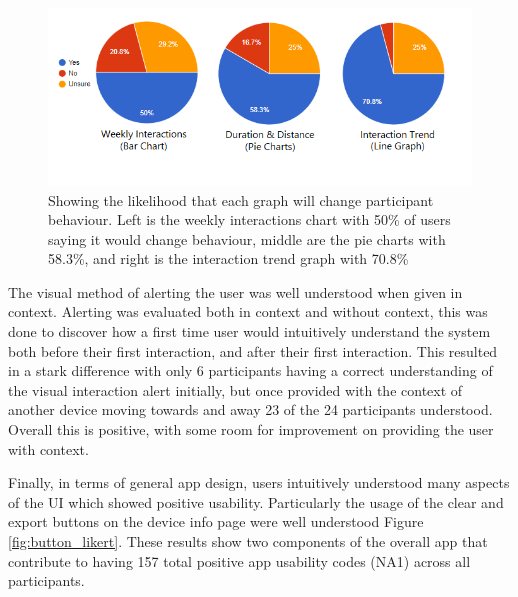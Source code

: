 \documentclass{l4proj}
\begin{document}
\begin{figure}[!htb]
    \centering
    \includegraphics[width=0.85\linewidth]{images/behaviour-graphs.png}

    \caption{ Showing the likelihood that each graph will change participant behaviour. Left is the weekly interactions chart with 50\% of users saying it would change behaviour, middle are the pie charts with 58.3\%, and right is the interaction trend graph with 70.8\% }

    \label{fig:behaviour}
\end{figure}

The visual method of alerting the user was well understood when given in context. Alerting was evaluated both in context and without context, this was done to discover how a first time user would intuitively understand the system both before their first interaction, and after their first interaction. This resulted in a stark difference with only 6 participants having a correct understanding of the visual interaction alert initially, but once provided with the context of another device moving towards and away 23 of the 24 participants understood. Overall this is positive, with some room for improvement on providing the user with context.

Finally, in terms of general app design, users intuitively understood many aspects of the UI which showed positive usability. Particularly the usage of the clear and export buttons on the device info page were well understood Figure \ref{fig:button_likert}. These results show two components of the overall app that contribute to having 157 total positive app usability codes (NA1) across all participants.
\end{document}
